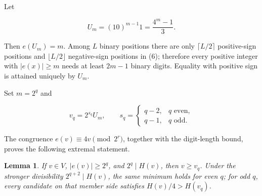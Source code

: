 \documentclass[11pt]{article}
\newtheorem{lemma}[theorem]{Lemma}
\numberwithin{equation}{section}
\begin{document}
Let

\[
U_m=(10)^{m-1}1=\frac{4^m-1}{3}.
\]

Then $e(U_m)=m$. Among $L$ binary positions there are only $\lceil L/2\rceil$ positive-sign
positions and $\lfloor L/2\rfloor$ negative-sign positions in (6); therefore every positive
integer with $|e(x)|\geq m$ needs at least $2m-1$ binary digits. Equality with positive sign is
attained uniquely by $U_m$.

Set $m=2^q$ and

\[
v_q=2^{s_q}U_m,\qquad
s_q=\begin{cases}q-2,&q\text{ even},\\q-1,&q\text{ odd}.\end{cases}
\tag{9}
\]

The congruence $e(v)\equiv4v\pmod{2^r}$, together with the digit-length bound, proves the
following extremal statement.

\begin{lemma}


If $v\in V$, $|e(v)|\geq2^q$, and $2^q\mid H(v)$, then $v\geq v_q$. Under the
stronger divisibility $2^{q+2}\mid H(v)$, the same minimum holds for even $q$; for odd $q$,
every candidate on that member side satisfies $H(v)/4>H(v_q)$.

\end{lemma}
\end{document}
